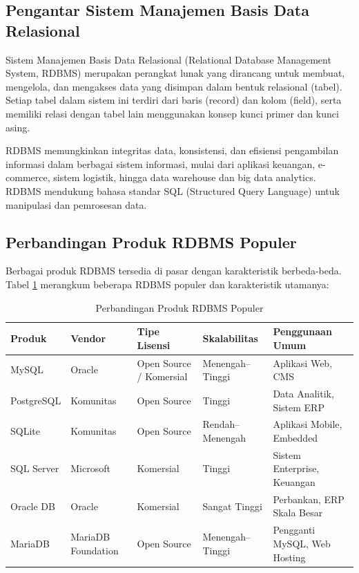 \subsection{Pengantar Sistem Manajemen Basis Data Relasional}

Sistem Manajemen Basis Data Relasional (Relational Database Management System, RDBMS) merupakan perangkat lunak yang dirancang untuk membuat, mengelola, dan mengakses data yang disimpan dalam bentuk relasional (tabel). Setiap tabel dalam sistem ini terdiri dari baris (record) dan kolom (field), serta memiliki relasi dengan tabel lain menggunakan konsep kunci primer dan kunci asing.

RDBMS memungkinkan integritas data, konsistensi, dan efisiensi pengambilan informasi dalam berbagai sistem informasi, mulai dari aplikasi keuangan, e-commerce, sistem logistik, hingga data warehouse dan big data analytics. RDBMS mendukung bahasa standar SQL (Structured Query Language) untuk manipulasi dan pemrosesan data.

\subsection{Perbandingan Produk RDBMS Populer}

Berbagai produk RDBMS tersedia di pasar dengan karakteristik berbeda-beda. Tabel \ref{tab:rdbms_comparison} merangkum beberapa RDBMS populer dan karakteristik utamanya:

\begin{table}[h]
	\centering
	\renewcommand{\arraystretch}{1.4}
	\begin{tabular}{|p{}|p{}|p{}|p{}|p{}|}
		\hline
		\textbf{Produk} & \textbf{Vendor} & \textbf{Tipe Lisensi} & \textbf{Skalabilitas} & \textbf{Penggunaan Umum} \\
		\hline
		MySQL & Oracle & Open Source / Komersial & Menengah–Tinggi & Aplikasi Web, CMS \\
		\hline
		PostgreSQL & Komunitas & Open Source & Tinggi & Data Analitik, Sistem ERP \\
		\hline
		SQLite & Komunitas & Open Source & Rendah–Menengah & Aplikasi Mobile, Embedded \\
		\hline
		SQL Server & Microsoft & Komersial & Tinggi & Sistem Enterprise, Keuangan \\
		\hline
		Oracle DB & Oracle & Komersial & Sangat Tinggi & Perbankan, ERP Skala Besar \\
		\hline
		MariaDB & MariaDB Foundation & Open Source & Menengah–Tinggi & Pengganti MySQL, Web Hosting \\
		\hline
	\end{tabular}
	\caption{Perbandingan Produk RDBMS Populer}
	\label{tab:rdbms_comparison}
\end{table}



